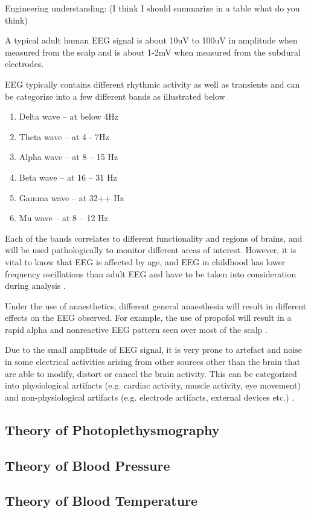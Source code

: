 Engineering understanding: (I think I should summarize in a table what do you think)

A typical adult human EEG signal is about 10uV to 100uV in amplitude when measured from the scalp and is about 1-2mV when measured from the subdural electrodes. 

EEG typically contains different rhythmic activity as well as transients and can be categorize into a few different bands as illustrated below

\begin{enumerate}
	\item Delta wave – at below 4Hz
	\item Theta wave – at 4 - 7Hz
	\item Alpha wave – at 8 – 15 Hz
	\item Beta wave – at 16 – 31 Hz
	\item Gamma wave – at 32++ Hz
	\item Mu wave – at 8 – 12 Hz
\end{enumerate}


Each of the bands correlates to different functionality and regions of brains, and will be used pathologically to monitor different areas of interest. However, it is vital to know that EEG is affected by age, and EEG in childhood has lower frequency oscillations than adult EEG and have to be taken into consideration during analysis \cite{jiahui3}. 

Under the use of anaesthetics, different general anaesthesia will result in different effects on the EEG observed. For example, the use of propofol will result in a rapid alpha and nonreactive EEG pattern seen over most of the scalp \cite{jiahui4}. 

Due to the small amplitude of EEG signal, it is very prone to artefact and noise in some electrical activities arising from other sources other than the brain that are able to modify, distort or cancel the brain activity. This can be categorized into physiological artifacts (e.g. cardiac activity, muscle activity, eye movement) and non-physiological artifacts (e.g. electrode artifacts, external devices etc.) \cite{jiahui5}.


\subsection{Theory of Photoplethysmography}

\subsection{Theory of Blood Pressure}

\subsection{Theory of Blood Temperature}
